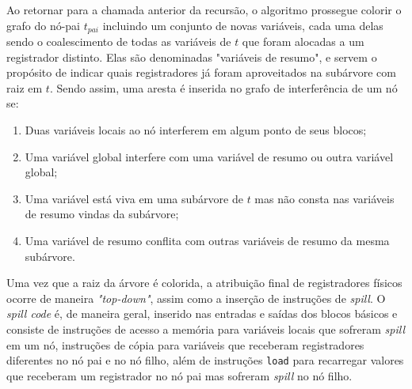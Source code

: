\documentclass[
	12pt,				%
	openright,			%
	oneside,			%
	a4paper,			%
	tccpreliminar,			%
	]{ABNT-DC-UEL}
\begin{document}
Ao retornar para a chamada anterior da recursão, o algoritmo prossegue colorir o grafo do nó-pai $t_{pai}$ incluindo um conjunto de novas variáveis, cada uma delas sendo o coalescimento de todas as variáveis de $t$ que foram alocadas a um registrador distinto. Elas são denominadas "variáveis de resumo", e servem o propósito de indicar quais registradores já foram aproveitados na subárvore com raiz em $t$. Sendo assim, uma aresta é inserida no grafo de interferência de um nó se:
\begin{enumerate}
    \item Duas variáveis locais ao nó interferem em algum ponto de seus blocos;
    \item Uma variável global interfere com uma variável de resumo ou outra variável global;
    \item Uma variável está viva em uma subárvore de $t$ mas não consta nas variáveis de resumo vindas da subárvore;
    \item Uma variável de resumo conflita com outras variáveis de resumo da mesma subárvore.
\end{enumerate}

Uma vez que a raiz da árvore é colorida, a atribuição final de registradores  físicos ocorre de maneira \textit{"top-down"}, assim como a inserção de instruções de \textit{spill}. O \textit{spill code} é, de maneira geral, inserido nas entradas e saídas dos blocos básicos e consiste de instruções de acesso a memória para variáveis locais que sofreram \textit{spill} em um nó, instruções de cópia para variáveis que receberam registradores diferentes no nó pai e no nó filho, além de instruções \texttt{load} para recarregar valores que receberam um registrador no nó pai mas sofreram \textit{spill} no nó filho.
\end{document}
